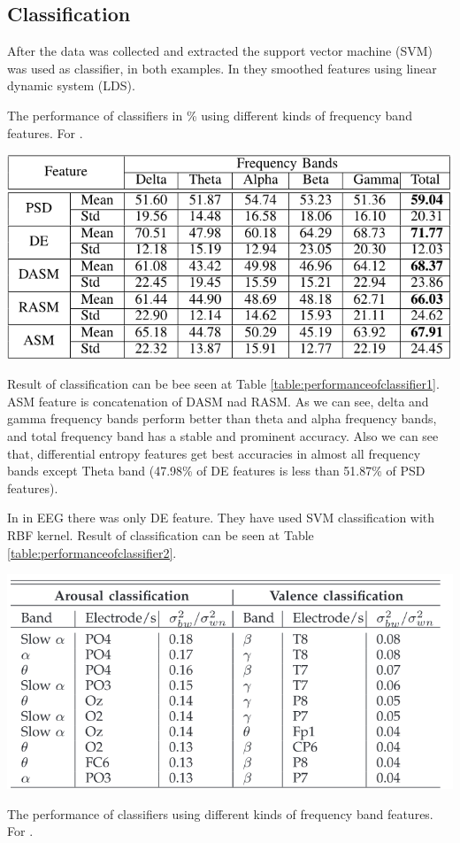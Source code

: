 \documentclass[10pt,journal,compsoc,twoside]{IEEEtran}
\newcommand{\Ref}[2]{#2 \ref{#1}}
\begin{document}
\subsection{Classification}
After the data was collected and extracted the support vector machine (SVM) was used as classifier, in both examples.
In  \cite{WeiLongBoNanBaoLiang2014} they smoothed features using linear dynamic system (LDS).
\begin{table}[ht]
	\centering %
	\caption{The performance of classifiers in \% using different kinds of frequency band features. For \cite{WeiLongBoNanBaoLiang2014}.}
	\label{table:performanceofclassifier1}
	\includegraphics[width=1.0\linewidth]{performanceOfClassifier1}
\end{table}

Result of classification can be bee seen at \Ref{table:performanceofclassifier1}{Table}. ASM feature is concatenation of DASM nad RASM. As we can see, delta and gamma frequency bands perform better than theta and alpha frequency bands, and total frequency band has a stable and  prominent  accuracy.  Also  we  can  see  that,  differential entropy features get best accuracies in almost all frequency  bands  except  Theta  band  (47.98\%  of  DE  features is  less  than  51.87\%  of  PSD  features).
\newline
\par In \cite{SoleymaniPanticPun2002} in EEG there was only DE feature. They have used SVM classification with RBF kernel. Result of classification can be seen at \Ref{table:performanceofclassifier2}{Table}.
\begin{table}[ht]
	\centering
	\includegraphics[width=1.0\linewidth]{performanceOfClassifier2}
	\caption{The performance of classifiers using different kinds of frequency band features. For \cite{SoleymaniPanticPun2002}.}
	\label{table:performanceofclassifier2}
\end{table}
\end{document}
